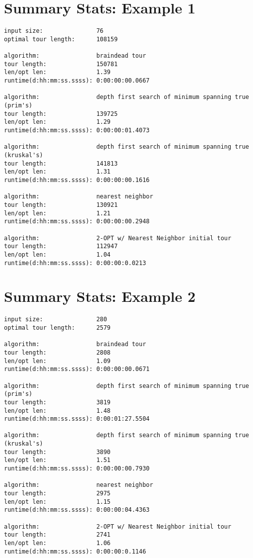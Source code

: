 \documentclass[12pt]{article}
\begin{document}
\newpage
\section*{Summary Stats: Example 1}
\begin{verbatim}
input size:               76
optimal tour length:      108159

algorithm:                braindead tour
tour length:              150781
len/opt len:              1.39
runtime(d:hh:mm:ss.ssss): 0:00:00:00.0667

algorithm:                depth first search of minimum spanning true (prim's) 
tour length:              139725
len/opt len:              1.29
runtime(d:hh:mm:ss.ssss): 0:00:00:01.4073

algorithm:                depth first search of minimum spanning true (kruskal's) 
tour length:              141813
len/opt len:              1.31
runtime(d:hh:mm:ss.ssss): 0:00:00:00.1616

algorithm:                nearest neighbor 
tour length:              130921
len/opt len:              1.21
runtime(d:hh:mm:ss.ssss): 0:00:00:00.2948

algorithm:                2-OPT w/ Nearest Neighbor initial tour
tour length:              112947
len/opt len:              1.04
runtime(d:hh:mm:ss.ssss): 0:00:00:0.0213
\end{verbatim}

\newpage
\section*{Summary Stats: Example 2}
\begin{verbatim}
input size:               280
optimal tour length:      2579

algorithm:                braindead tour
tour length:              2808
len/opt len:              1.09
runtime(d:hh:mm:ss.ssss): 0:00:00:00.0671

algorithm:                depth first search of minimum spanning true (prim's) 
tour length:              3819
len/opt len:              1.48
runtime(d:hh:mm:ss.ssss): 0:00:01:27.5504

algorithm:                depth first search of minimum spanning true (kruskal's) 
tour length:              3890
len/opt len:              1.51
runtime(d:hh:mm:ss.ssss): 0:00:00:00.7930

algorithm:                nearest neighbor 
tour length:              2975
len/opt len:              1.15
runtime(d:hh:mm:ss.ssss): 0:00:00:04.4363

algorithm:                2-OPT w/ Nearest Neighbor initial tour
tour length:              2741
len/opt len:              1.06
runtime(d:hh:mm:ss.ssss): 0:00:00:0.1146
\end{verbatim}
\end{document}
